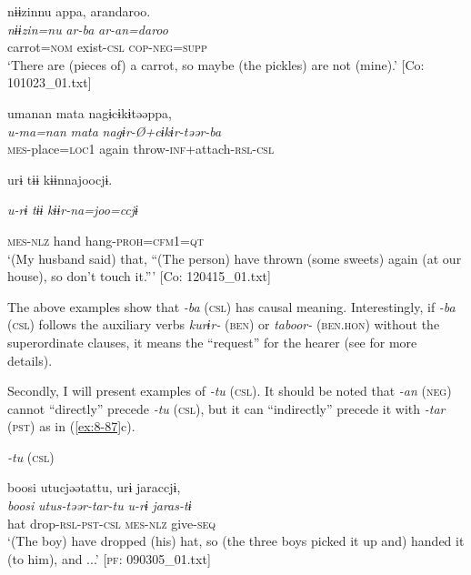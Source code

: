 
{\TM}
\glll  nɨɨzinnu  appa,  arandaroo.\\
\textit{nɨɨzin=nu}  \textit{ar-ba}  \textit{ar-an=daroo}\\
carrot=\textsc{nom}  exist-\textsc{csl}  \textsc{cop}-\textsc{neg}=\textsc{supp}\\
\glt ‘There are (pieces of) a carrot, so maybe (the pickles) are not (mine).’ [Co: 101023\_01.txt]

\ex
{\TM}
\glll  umanan  mata  nagɨcɨkɨtəəppa,\\
\textit{u-ma=nan}  \textit{mata}  \textit{nagɨr-Ø+cɨkɨr-təər-ba}\\
\textsc{mes}-place=\textsc{loc}1  again  throw-\textsc{inf}+attach-\textsc{rsl}-\textsc{csl}

      urɨ  tɨɨ  kɨɨnnajoocjɨ.

      \textit{u-rɨ}  \textit{tɨɨ}  \textit{kɨɨr-na=joo=ccjɨ}

      \textsc{mes}-\textsc{nlz}  hand  hang-\textsc{proh}=\textsc{cfm1}=\textsc{qt}\\
\glt ‘(My husband said) that, “(The person) have thrown (some sweets) again (at our house), so don’t touch it.”’ [Co: 120415\_01.txt]
\z
\z

The above examples show that \textit{-ba} (\textsc{csl}) has causal meaning. Interestingly, if \textit{-ba} (\textsc{csl}) follows the auxiliary verbs \textit{kurɨr-} (\textsc{ben}) or \textit{taboor-} (\textsc{ben}.\textsc{hon}) without the superordinate clauses, it means the “request” for the hearer (see  for more details).

  Secondly, I will present examples of \textit{-tu} (\textsc{csl}). It should be noted that \textit{-an} (\textsc{neg}) cannot “directly” precede \textit{-tu} (\textsc{csl}), but it can “indirectly” precede it with \textit{-tar} (\textsc{pst}) as in (\ref{ex:8-87}c).

\ea\label{ex:8-87}
  \textit{-tu} (\textsc{csl})

\ea
{\TM}
\glll  boosi  utucjəətattu,  urɨ  jaraccjɨ,\\
\textit{boosi}  \textit{utus-təər-tar-tu}  \textit{u-rɨ}  \textit{jaras-tɨ}\\
hat  drop-\textsc{rsl}-\textsc{pst}-\textsc{csl}  \textsc{mes}-\textsc{nlz}  give-\textsc{seq}\\
\glt ‘(The boy) have dropped (his) hat, so (the three boys picked it up and) handed it (to him), and ...’ [\textsc{pf}: 090305\_01.txt]

